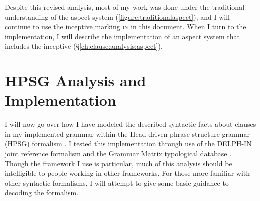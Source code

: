 \begin{comment}
\ex \label{ex:mul1}
\begingl
\glpreamble mułaa //
\gla muł-(y)aˑ //
\glb tide.comes.in-\textsc{cv} //
\glft tide starting to come up (\textbf{N}, Fidelia Haiyupis & \textsc{B}, Bob Mundy) //
\endgl
\xe

\ex \label{ex:mul2}
\begingl
\glpreamble muułšiƛ //
\gla muł-šiƛ-LS(?) //
\glb tide.comes.in-\textsc{mo}-\textsc{grad}(?) //
\glft tide coming in (\textbf{N}, Fidelia Haiyupis & \textsc{B}, Bob Mundy) //
\endgl
\xe

\ex \label{ex:mul3}
\begingl
\glpreamble mułiičiƛ //
\gla muł-a-LS //
\glb tide.comes.in-\textsc{mo}-\textsc{grad} //
\glft tide coming in (\textbf{N}, Fidelia Haiyupis & \textsc{B}, Bob Mundy) //
\endgl
\xe
\end{comment}




Despite this revised analysis, most of my work was done under the traditional understanding of the aspect system (\cref{figure:traditionalaspect}), and I will continue to use the inceptive marking \textsc{in} in this document. When I turn to the implementation, I will describe the implementation of an aspect system that includes the inceptive (\S\ref{ch:clause:analysis:aspect}).

\section{HPSG Analysis and Implementation} \label{ch:clause:analysis}

I will now go over how I have modeled the described syntactic facts about clauses in my implemented grammar within the Head-driven phrase structure grammar (HPSG) formalism \citep{pollardsag1994}. I tested this implementation through use of the DELPH-IN joint reference formalism \citep{copestake2002} and the Grammar Matrix typological database \citep{bender2002}. Though the framework I use is particular, much of this analysis should be intelligible to people working in other frameworks. For those more familiar with other syntactic formalisms, I will attempt to give some basic guidance to decoding the formalism.

